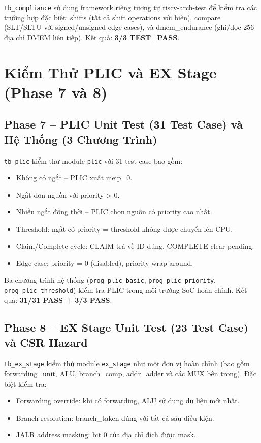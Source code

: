 \texttt{tb\_compliance} sử dụng framework riêng tương tự riscv-arch-test để kiểm tra các trường hợp đặc biệt: shifts (tất cả shift operations với biên), compare (SLT/SLTU với signed/unsigned edge cases), và dmem\_endurance (ghi/đọc 256 địa chỉ DMEM liên tiếp). Kết quả: \textbf{3/3 TEST\_PASS}.

\section{Kiểm Thử PLIC và EX Stage (Phase 7 và 8)}

\subsection{Phase 7 -- PLIC Unit Test (31 Test Case) và Hệ Thống (3 Chương Trình)}

\texttt{tb\_plic} kiểm thử module \texttt{plic} với 31 test case bao gồm:
\begin{itemize}
    \item Không có ngắt -- PLIC xuất meip=0.
    \item Ngắt đơn nguồn với priority > 0.
    \item Nhiều ngắt đồng thời -- PLIC chọn nguồn có priority cao nhất.
    \item Threshold: ngắt có priority = threshold không được chuyển lên CPU.
    \item Claim/Complete cycle: CLAIM trả về ID đúng, COMPLETE clear pending.
    \item Edge case: priority = 0 (disabled), priority wrap-around.
\end{itemize}

Ba chương trình hệ thống (\texttt{prog\_plic\_basic}, \texttt{prog\_plic\_priority}, \texttt{prog\_plic\_threshold}) kiểm tra PLIC trong môi trường SoC hoàn chỉnh. Kết quả: \textbf{31/31 PASS + 3/3 PASS}.

\subsection{Phase 8 -- EX Stage Unit Test (23 Test Case) và CSR Hazard}

\texttt{tb\_ex\_stage} kiểm thử module \texttt{ex\_stage} như một đơn vị hoàn chỉnh (bao gồm forwarding\_unit, ALU, branch\_comp, addr\_adder và các MUX bên trong). Đặc biệt kiểm tra:
\begin{itemize}
    \item Forwarding override: khi có forwarding, ALU sử dụng dữ liệu mới nhất.
    \item Branch resolution: branch\_taken đúng với tất cả sáu điều kiện.
    \item JALR address masking: bit 0 của địa chỉ đích được mask.
\end{itemize}

